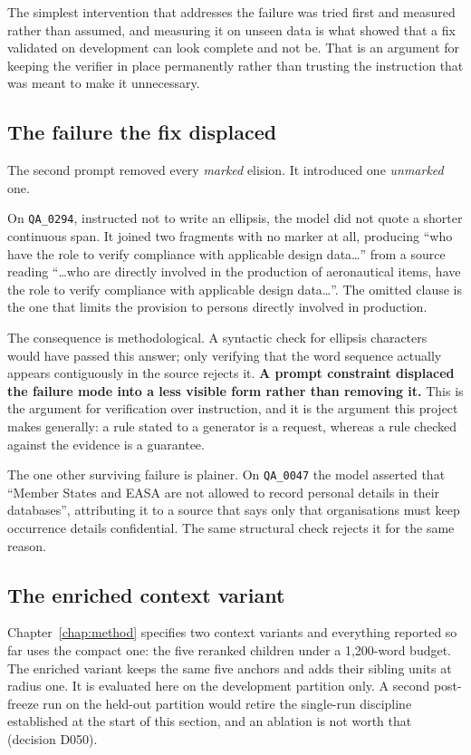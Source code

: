The simplest intervention that addresses the failure was tried first and
measured rather than assumed, and measuring it on unseen data is what showed
that a fix validated on development can look complete and not be. That is an argument for keeping the
verifier in place permanently rather than trusting the instruction that was meant
to make it unnecessary.

\subsection{The failure the fix displaced}

The second prompt removed every \emph{marked} elision. It introduced one
\emph{unmarked} one.

On \texttt{QA\_0294}, instructed not to write an ellipsis, the model did not
quote a shorter continuous span. It joined two fragments with no marker at all,
producing \enquote{who have the role to verify compliance with applicable design
data\ldots} from a source reading \enquote{\ldots who are directly involved in the
production of aeronautical items, have the role to verify compliance with
applicable design data\ldots}. The omitted clause is the one that limits the
provision to persons directly involved in production.

The consequence is methodological. A syntactic check for ellipsis characters
would have passed this answer; only verifying that the word sequence actually
appears contiguously in the source rejects it. \textbf{A prompt constraint
displaced the failure mode into a less visible form rather than removing it.}
This is the argument for verification over instruction, and it is the argument
this project makes generally: a rule stated to a generator is a request, whereas
a rule checked against the evidence is a guarantee.

The one other surviving failure is plainer. On \texttt{QA\_0047} the model
asserted that \enquote{Member States and EASA are not allowed to record personal
details in their databases}, attributing it to a source that says only that
organisations must keep occurrence details confidential. The same structural check
rejects it for the same reason.

\subsection{The enriched context variant}
\label{sec:enriched-context}

Chapter~\ref{chap:method} specifies two context variants and everything reported
so far uses the compact one: the five reranked children under a 1{,}200-word
budget. The enriched variant keeps the same five anchors and adds their sibling
units at radius one. It is evaluated here on the development partition only. A
second post-freeze run on the held-out partition would retire the single-run discipline established at the start of this section, and an ablation is not worth that (decision D050).

